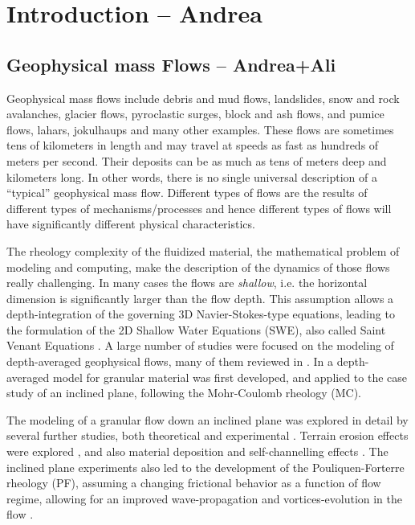 \documentclass{article}
\begin{document}
\section{Introduction -- Andrea}\label{sec:Intro}

\subsection{Geophysical mass Flows -- Andrea+Ali}\label{subsec:FlowTypes}
Geophysical mass flows include debris and mud flows, landslides, snow and rock avalanches, glacier flows, pyroclastic surges, block and ash flows, and pumice flows, lahars, jokulhaups and many other examples. These flows are sometimes tens of kilometers in length and may travel at speeds as fast as hundreds of meters per second. Their deposits can be as much as tens of meters deep and kilometers long. In other words, there is no single universal description of a ``typical'' geophysical mass flow. Different types of flows are the results of different types of mechanisms/processes and hence different types of flows will have significantly different physical characteristics.

The rheology complexity of the fluidized material, the mathematical problem of modeling and computing, make the description of the dynamics of those flows really challenging. In many cases the flows are \emph{shallow}, i.e. the horizontal dimension is significantly larger than the flow depth. This assumption allows a depth-integration of the governing 3D Navier-Stokes-type equations, leading to the formulation of the 2D Shallow Water Equations (SWE), also called Saint Venant Equations \citep{Batchelor2000, Luca2016}. A large number of studies were focused on the modeling of depth-averaged geophysical flows, many of them reviewed in \cite{PudasainiHutter2007}. In \cite{SavageHutter1989,Jaeger1989, Hutter1993, FraccarolloToro1995, DadeHuppert1998} a depth-averaged model for granular material was first developed, and applied to the case study of an inclined plane, following the Mohr-Coulomb rheology (MC).

The modeling of a granular flow down an inclined plane was explored in detail by several further studies, both theoretical and experimental \citep{Pouliquen1999, RuyerQuil2000, Silbert2001, Balmforth2005, Bursik2005, DaCruz2005, Lajeunesse2005}. Terrain erosion effects were explored \citep{Pitman2003b, Edwards2015}, and also material deposition and self-channelling effects \citep{Mangeney2005, Mangeney2007}. The inclined plane experiments also led to the development of the Pouliquen-Forterre rheology (PF), assuming a changing frictional behavior as a function of flow regime, allowing for an improved wave-propagation and vortices-evolution in the flow \citep{Pouliquen1999, ForterrePouliquen2002, PouliquenForterre2002, ForterrePouliquen2003, Forterre2006, Jop2006}.
\end{document}
